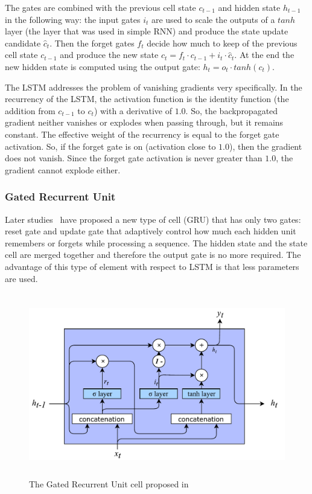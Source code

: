 The gates are combined with the previous cell state $ c_{t-1}$  and hidden state  $h_{t-1}$  in the following way: the input gates $i_{t}$ are used to scale the outputs of a  $tanh$ layer (the layer that was used in simple RNN) and produce the state update candidate  $\hat c_{t}$. Then the forget gates $f_{t}$ decide how much to keep of the previous cell state $c_{t-1}$ and produce the new state  $c_{t}=f_{t}\cdot c_{t-1}+i_{t}\cdot \hat c_{t}$. At the end the new hidden state is computed using the output gate: $h_{t}=o_{t}\cdot tanh \left( c_{t} \right)$.

The LSTM addresses the problem of vanishing gradients very specifically. In the recurrency of the LSTM, the activation function is the identity function (the addition from $c_{t-1}$ to $c_{t}$) with a derivative of $1.0$. So, the backpropagated gradient neither vanishes or explodes when passing through, but it remains constant. The effective weight of the recurrency is equal to the forget gate activation. So, if the forget gate is on (activation close to $1.0$), then the gradient does not vanish. Since the forget gate activation is never greater than $1.0$, the gradient cannot explode either.

\subsubsection{Gated Recurrent Unit}
Later studies~\cite{cho2014learning} have proposed a new type of cell (GRU) that has only two gates: reset gate and update gate that adaptively control how much each hidden unit remembers or forgets while processing a sequence. The hidden state and the state cell are merged together and therefore the output gate is no more required.
The advantage of this type of element with respect to LSTM is that less parameters are used.

\begin{figure}[!htb]
    \centering
    \includegraphics[max width=0.9\linewidth,max height=8cm,keepaspectratio]{figures/GRU}
    \caption{The Gated Recurrent Unit cell proposed in~\cite{cho2014learning}}\label{fig:GRU}
\end{figure}

